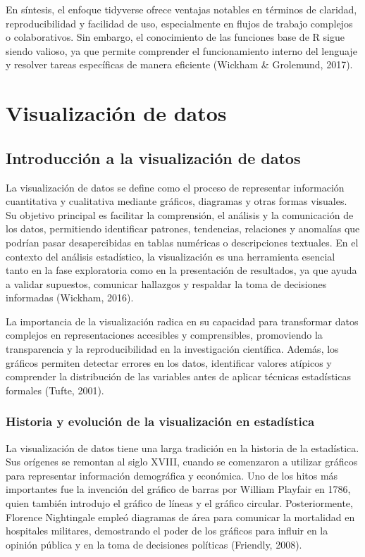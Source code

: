 \documentclass[
  spanish,
  a4paper,
  DIV=11,
  numbers=noendperiod,
  onepage,
  openany]{scrreprt}
\begin{document}
En síntesis, el enfoque tidyverse ofrece ventajas notables en términos
de claridad, reproducibilidad y facilidad de uso, especialmente en
flujos de trabajo complejos o colaborativos. Sin embargo, el
conocimiento de las funciones base de R sigue siendo valioso, ya que
permite comprender el funcionamiento interno del lenguaje y resolver
tareas específicas de manera eficiente (Wickham \& Grolemund, 2017).

\part{Visualización de datos}


\chapter{Introducción a la visualización de
datos}\label{introducciuxf3n-a-la-visualizaciuxf3n-de-datos}

La visualización de datos se define como el proceso de representar
información cuantitativa y cualitativa mediante gráficos, diagramas y
otras formas visuales. Su objetivo principal es facilitar la
comprensión, el análisis y la comunicación de los datos, permitiendo
identificar patrones, tendencias, relaciones y anomalías que podrían
pasar desapercibidas en tablas numéricas o descripciones textuales. En
el contexto del análisis estadístico, la visualización es una
herramienta esencial tanto en la fase exploratoria como en la
presentación de resultados, ya que ayuda a validar supuestos, comunicar
hallazgos y respaldar la toma de decisiones informadas (Wickham, 2016).

La importancia de la visualización radica en su capacidad para
transformar datos complejos en representaciones accesibles y
comprensibles, promoviendo la transparencia y la reproducibilidad en la
investigación científica. Además, los gráficos permiten detectar errores
en los datos, identificar valores atípicos y comprender la distribución
de las variables antes de aplicar técnicas estadísticas formales (Tufte,
2001).

\section{Historia y evolución de la visualización en
estadística}\label{historia-y-evoluciuxf3n-de-la-visualizaciuxf3n-en-estaduxedstica}

La visualización de datos tiene una larga tradición en la historia de la
estadística. Sus orígenes se remontan al siglo XVIII, cuando se
comenzaron a utilizar gráficos para representar información demográfica
y económica. Uno de los hitos más importantes fue la invención del
gráfico de barras por William Playfair en 1786, quien también introdujo
el gráfico de líneas y el gráfico circular. Posteriormente, Florence
Nightingale empleó diagramas de área para comunicar la mortalidad en
hospitales militares, demostrando el poder de los gráficos para influir
en la opinión pública y en la toma de decisiones políticas (Friendly,
2008).
\end{document}

